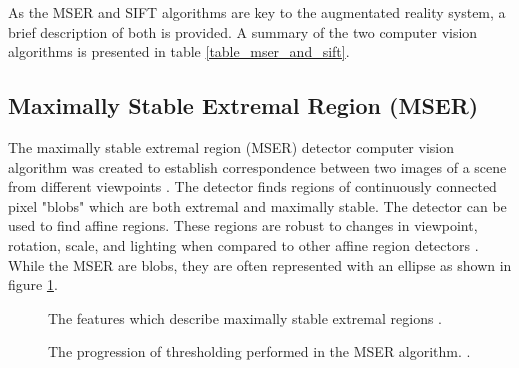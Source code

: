 \documentclass[oneside,11pt]{Latex/Classes/PhDthesisPSnPDF}
\begin{document}
As the MSER and SIFT algorithms are key to the augmentated reality system, a brief description of both is provided.  A summary of the two computer vision algorithms is presented in table \ref{table_mser_and_sift}.

\subsection{Maximally Stable Extremal Region (MSER)}

The maximally stable extremal region (MSER) detector computer vision algorithm was created to establish correspondence between two images of a scene from different viewpoints \cite{matas_02}.  The detector finds regions of continuously connected pixel "blobs" which are both extremal and maximally stable.  The detector can be used to find affine regions.  These regions are robust to changes in viewpoint, rotation, scale, and lighting when compared to other affine region detectors \cite{mikolajczyk_05}.  While the MSER are blobs, they are often represented with an ellipse as shown in figure \ref{fig_mser_features}.

\begin{figure}[h!]
  \caption{\label{fig_mser_features} The features which describe maximally stable extremal regions \cite{marano_09}.}
\end{figure}

\begin{figure}[h!]
  \caption{\label{fig_mser_sequence} The progression of thresholding performed in the MSER algorithm. \cite{najman_06}.}
\end{figure}
\end{document}
